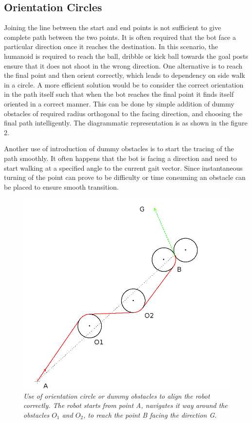 \documentclass[letterpaper, 10 pt, conference]{ieeeconf}  %
\begin{document}
\subsection{Orientation Circles}
Joining the line between the start and end points is not sufficient to give complete path between the two points. It is often required that the bot face a particular direction once it reaches the destination. In this scenario, the humanoid is required to reach the ball, dribble or kick ball towards the goal posts ensure that it does not shoot in the wrong direction. One alternative is to reach the final point and then orient correctly, which leads to dependency on side walk in a circle. A more efficient solution would be to consider the correct orientation in the path itself such that when the bot reaches the final point it finds itself oriented in a correct manner. This can be done by simple addition of dummy obstacles of required radius orthogonal to the facing direction, and choosing the final path intelligently. The diagrammatic representation is as shown in the figure 2. 

Another use of introduction of dummy obstacles is to start the tracing of the path smoothly. It often happens that the bot is facing a direction and need to start walking at a specified angle to the current gait vector. Since instantaneous turning of the point can prove to be difficulty or time consuming an obstacle can be placed to ensure smooth transition.  
\begin{figure}[h]  
\begin{center}  
\includegraphics[scale=0.35]{orientation_circle2.JPG}  
\caption{\small \sl Use of orientation circle or dummy obstacles to align the robot correctly. The robot starts from point A, navigates it way around the obstacles $O_1$ and $O_2$, to reach the point B facing the direction G. \label{fig:orientation}}  
\end{center}  
\end{figure}
\end{document}

